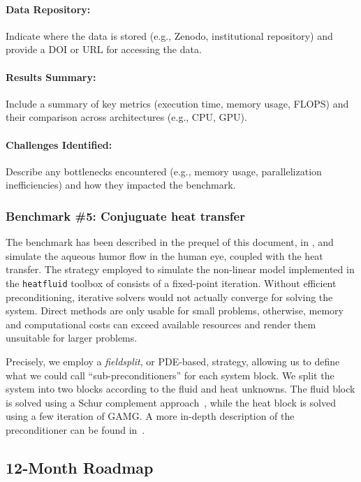 \paragraph{Data Repository:} Indicate where the data is stored (e.g., Zenodo, institutional repository) and provide a DOI or URL for accessing the data.

\paragraph{Results Summary:} Include a summary of key metrics (execution time, memory usage, FLOPS) and their comparison across architectures (e.g., CPU, GPU).

\paragraph{Challenges Identified:} Describe any bottlenecks encountered (e.g., memory usage, parallelization inefficiencies) and how they impacted the benchmark.

\subsubsection{Benchmark \#5: Conjuguate heat transfer}



The benchmark has been described in the prequel of this document, in , and simulate the aqueous humor flow in the human eye, coupled with the heat transfer.
The strategy employed to simulate the non-linear model implemented in the \texttt{heatfluid} toolbox of \Feelpp consists of a fixed-point iteration.
Without efficient preconditioning, iterative solvers would not actually converge for solving the system.
Direct methods are only usable for small problems, otherwise, memory and computational costs can exceed available resources and render them unsuitable for larger problems.

Precisely, we employ a \emph{fieldsplit}, or PDE-based, strategy, allowing us to define what we could call ``sub-preconditioners'' for each system block.
We split the system into two blocks according to the fluid and heat unknowns.
The fluid block is solved using a Schur complement approach~\cite{elman_finite_2014}, while the heat block is solved using a few iteration of GAMG.
%
A more in-depth description of the preconditioner can be found in~\cite{saigre_coupled_2024_paper}.


\subsection{12-Month Roadmap}
\label{sec:WP3:Feelpp:roadmap}

